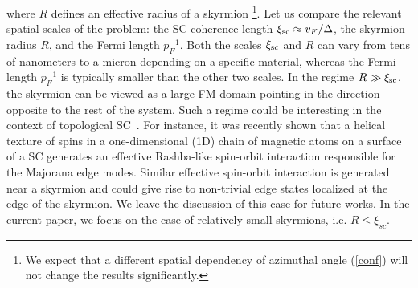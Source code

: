 \documentclass[twocolumn,showpacs,floatfix,longbibliography]{revtex4-1}
\begin{document}
where $R$ defines an effective radius of a skyrmion \footnote{We expect that a different spatial dependency of azimuthal angle (\ref{conf}) will not change the results significantly.}. Let us compare the relevant spatial scales of the problem: the SC coherence length $\xi_{\rm sc} \approx v_F/\Delta$, the skyrmion radius $R$, and the Fermi length $p_F^{-1}$. Both the scales $\xi_{\rm sc}$ and $R$ can vary from tens of nanometers to a micron depending on a specific material, whereas the Fermi length $p_F^{-1}$ is typically smaller than the other two scales. In the regime $R\gg \xi_{\rm sc}$, the skyrmion can be viewed as a large FM domain pointing in the direction opposite to the rest of the system. Such a regime could be interesting in the context of topological SC~\cite{Alicea2012}. For instance, it was recently shown \cite{Klinovaja2013} that a helical texture of spins in a one-dimensional (1D) chain of magnetic atoms on a surface of a SC generates an effective Rashba-like spin-orbit interaction responsible for the Majorana edge modes. Similar effective spin-orbit interaction is generated near a skyrmion and could give rise to non-trivial edge states localized at the edge of the skyrmion. We leave the discussion of this  case for future works. In the current paper, we focus on the case of relatively small skyrmions, i.e. $R\le \xi_{sc}$.
\end{document}
